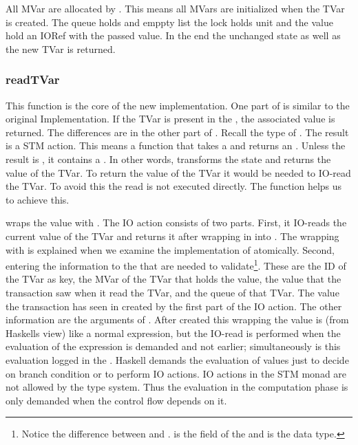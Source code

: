 All MVar are allocated by . This means all MVars are initialized when the TVar is created.
The queue holds and emppty list the lock holds unit and the value hold an IORef with the passed value.
In the end the unchanged state as well as the new TVar is returned.

\subsubsection{readTVar}
This function is the core of the new implementation. One part of  is similar to the original 
Implementation. If the TVar is present in the , the associated value is returned.
The differences are in the other part of . Recall the type of .
The result is a STM action. This means a function that takes a  and returns an . 
Unless the result is , it contains a . In other words,  transforms
the state and returns the value of the TVar. To return the value of the TVar it would be needed to IO-read the
TVar. To avoid this the read is not executed directly. The function  helps us to achieve this.

 wraps
the value with . The IO action consists of two parts. First, it IO-reads the 
current value of the TVar and returns it after wrapping in into . The wrapping with 
 is explained when we examine the implementation of atomically. Second, entering the 
information to the  that are needed to validate\footnote{Notice the difference between 
 and .  is the field of the  and 
 is the data type.}. These are the ID of the TVar as 
key, the MVar of the TVar that holds the value, the value that the transaction saw when it read
the TVar, and the queue of that TVar. The value the transaction has seen in created by the first 
part of the IO action. The other information are the arguments of . After 
created this wrapping the value is (from Haskells view) like a normal expression, but the IO-read is
performed when the evaluation of the expression is demanded and not earlier; simultaneously is this 
evaluation logged in the . Haskell demands the evaluation of values just to decide on
branch condition or to perform IO actions. IO actions in the STM monad are not allowed by the type
system. Thus the evaluation in the computation phase is only demanded when the control flow depends 
on it. 

